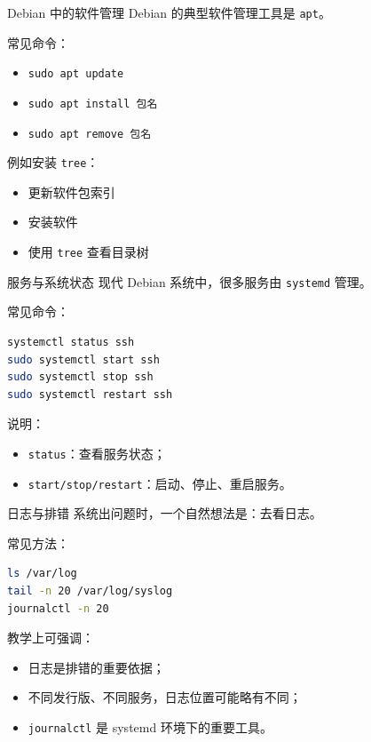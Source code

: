 \documentclass[aspectratio=169]{beamer}
\begin{document}
\begin{frame}{Debian 中的软件管理}
Debian 的典型软件管理工具是 \texttt{apt}。

\vspace{0.5em}
常见命令：
\begin{itemize}
  \item \texttt{sudo apt update}
  \item \texttt{sudo apt install 包名}
  \item \texttt{sudo apt remove 包名}
\end{itemize}

\vspace{0.5em}
例如安装 \texttt{tree}：
\begin{itemize}
  \item 更新软件包索引
  \item 安装软件
  \item 使用 \texttt{tree} 查看目录树
\end{itemize}
\end{frame}

\begin{frame}[fragile]{服务与系统状态}
现代 Debian 系统中，很多服务由 \texttt{systemd} 管理。

常见命令：
\begin{lstlisting}[language=bash]
systemctl status ssh
sudo systemctl start ssh
sudo systemctl stop ssh
sudo systemctl restart ssh
\end{lstlisting}

\vspace{0.5em}
说明：
\begin{itemize}
  \item \texttt{status}：查看服务状态；
  \item \texttt{start/stop/restart}：启动、停止、重启服务。
\end{itemize}
\end{frame}

\begin{frame}[fragile]{日志与排错}
系统出问题时，一个自然想法是：\alert{去看日志。}

常见方法：
\begin{lstlisting}[language=bash]
ls /var/log
tail -n 20 /var/log/syslog
journalctl -n 20
\end{lstlisting}

\vspace{0.5em}
教学上可强调：
\begin{itemize}
  \item 日志是排错的重要依据；
  \item 不同发行版、不同服务，日志位置可能略有不同；
  \item \texttt{journalctl} 是 systemd 环境下的重要工具。
\end{itemize}
\end{frame}
\end{document}
